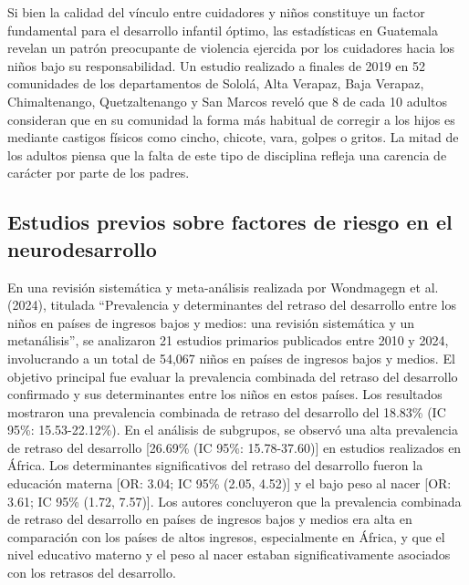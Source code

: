 \documentclass[11pt,letterpaper]{report}
\begin{document}
Si bien la calidad del vínculo entre cuidadores y niños constituye un factor
fundamental para el desarrollo infantil óptimo, las estadísticas en Guatemala
revelan un patrón preocupante de violencia ejercida por los cuidadores hacia
los niños bajo su responsabilidad. Un estudio realizado a finales de 2019 en 52
comunidades de los departamentos de Sololá, Alta Verapaz, Baja Verapaz,
Chimaltenango, Quetzaltenango y San Marcos reveló que 8 de cada 10 adultos
consideran que en su comunidad la forma más habitual de corregir a los hijos es
mediante castigos físicos como cincho, chicote, vara, golpes o gritos. La mitad
de los adultos piensa que la falta de este tipo de disciplina refleja una
carencia de carácter por parte de los padres. \cite{PoliticaInfanciaGuate}
\cite{UNICEFComportamientosNinez}

\subsection{Estudios previos sobre factores de riesgo en el neurodesarrollo}
En una revisión sistemática y meta-análisis realizada por Wondmagegn et al.
(2024), titulada ``Prevalencia y determinantes del retraso del desarrollo entre
los niños en países de ingresos bajos y medios: una revisión sistemática y un
metanálisis'', se analizaron 21 estudios primarios publicados entre 2010 y
2024, involucrando a un total de 54,067 niños en países de ingresos bajos y
medios. El objetivo principal fue evaluar la prevalencia combinada del retraso
del desarrollo confirmado y sus determinantes entre los niños en estos países.
Los resultados mostraron una prevalencia combinada de retraso del desarrollo
del 18.83\% (IC 95\%: 15.53-22.12\%). En el análisis de subgrupos, se observó
una alta prevalencia de retraso del desarrollo [26.69\% (IC 95\%: 15.78-37.60)]
en estudios realizados en África. Los determinantes significativos del retraso
del desarrollo fueron la educación materna [OR: 3.04; IC 95\% (2.05, 4.52)] y
el bajo peso al nacer [OR: 3.61; IC 95\% (1.72, 7.57)]. Los autores concluyeron
que la prevalencia combinada de retraso del desarrollo en países de ingresos
bajos y medios era alta en comparación con los países de altos ingresos,
especialmente en África, y que el nivel educativo materno y el peso al nacer
estaban significativamente asociados con los retrasos del desarrollo.
\cite{Wondmagegn2024}
\end{document}
